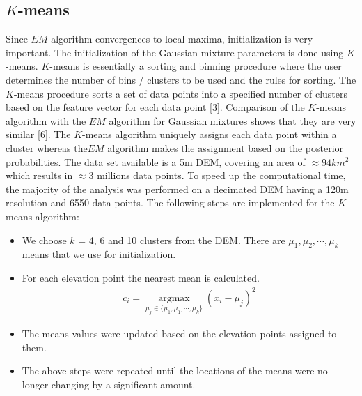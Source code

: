 \documentclass[12pt,letterpaper]{article}
\begin{document}
\subsection{$K$-means}
Since $EM$ algorithm convergences to local maxima, initialization is very important. The initialization 
of the Gaussian mixture parameters is done using $K$-means.
$K$-means is essentially a sorting and binning procedure where the user determines the number 
of bins / clusters to be used and the rules for sorting. The
$K$-means procedure sorts a set of data points into a specified number of clusters based on the 
feature vector for each data point [3].
Comparison of the $K$-means algorithm with the $EM$ algorithm for Gaussian mixtures shows that they are
very similar [6]. The $K$-means algorithm uniquely assigns each data point within a cluster whereas the$EM$ algorithm makes
the assignment based on the posterior probabilities.
The data set available is a 5m DEM, covering an area of $\approx 94 km^2$ which results in $\approx 3$ millions 
data points. To speed up the computational time, the majority of the analysis was performed on a decimated 
DEM having a 120m resolution and 6550 data points. 
The following steps are implemented for the $K$-means algorithm:
\begin{itemize}
\item We choose $k$ = 4, 6 and 10 clusters from the DEM. There are $\mu_1, \mu_2, \cdots , \mu_k$ means 
that we use for initialization.
\item For each elevation point the nearest mean is calculated.
\begin{align}
c_{i} = \underset{\mu_j \in \{\mu_1, \mu_1, \cdots, \mu_k \}}{\operatorname{argmax}} (x_i - \mu_j)^2
\end{align}
\item The means values were updated based on the elevation points assigned to them. 
\item The above steps were repeated until the locations of the means were no longer changing
by a significant amount.
\end{itemize}
\end{document}
